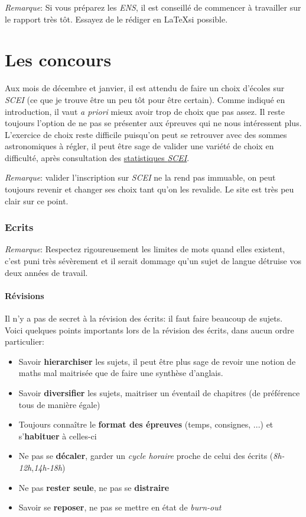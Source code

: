 \documentclass{article}
\begin{document}
\textit{Remarque}: Si vous préparez les \textit{ENS}, il est conseillé de commencer à travailler sur le rapport très tôt.
Essayez de le rédiger en \LaTeX si possible.

\part{Les concours}
Aux mois de décembre et janvier, il est attendu de faire un choix d'écoles sur \textit{SCEI} (ce que je trouve être un peu tôt pour être certain).
Comme indiqué en introduction, il vaut \textit{a priori} mieux avoir trop de choix que pas assez.
Il reste toujours l'option de ne pas se présenter aux épreuves qui ne nous intéressent plus.
L'exercice de choix reste difficile puisqu'on peut se retrouver avec des sommes astronomiques à régler, il peut être sage de valider une variété de choix en difficulté, après consultation des \href{https://www.scei-concours.fr/statistiques.php}{statistiques \textit{SCEI}}.

\textit{Remarque}: valider l'inscription sur \textit{SCEI} ne la rend pas immuable, on peut toujours revenir et changer ses choix tant qu'on les revalide.
Le site est très peu clair sur ce point.

\section{Ecrits}
\textit{Remarque}: Respectez rigoureusement les limites de mots quand elles existent, c'est puni très sévèrement et il serait dommage qu'un sujet de langue détruise vos deux années de travail.

\subsection{Révisions}
Il n'y a pas de secret à la révision des écrits: il faut faire beaucoup de sujets.
Voici quelques points importants lors de la révision des écrits, dans aucun ordre particulier:


\begin{itemize}
\item  Savoir \textbf{hierarchiser} les sujets, il peut être plus sage de revoir une notion de maths mal maitrisée que de faire une synthèse d'anglais.
\item  Savoir \textbf{diversifier} les sujets, maitriser un éventail de chapitres (de préférence tous de manière égale)
\item  Toujours connaître le \textbf{format des épreuves} (temps, consignes, ...) et s'\textbf{habituer} à celles-ci
\item  Ne pas se \textbf{décaler}, garder un \textit{cycle horaire} proche de celui des écrits (\textit{8h-12h},\textit{14h-18h})
\item  Ne pas \textbf{rester seul\textperiodcentered e}, ne pas se \textbf{distraire}
\item  Savoir se \textbf{reposer}, ne pas se mettre en état de \textit{burn-out}

\end{itemize}
\end{document}
